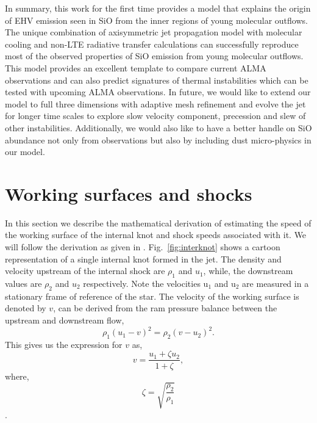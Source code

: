 \documentclass[useAMS,usenatbib]{mn2e}
\begin{document}
In summary, this work for the first time provides a model
that explains the origin of EHV emission seen in SiO from 
the inner regions of young molecular outflows. The unique combination
of axisymmetric jet propagation model with molecular cooling and
non-LTE radiative transfer calculations can successfully reproduce most
of the observed properties of SiO emission from young molecular
outflows. This model provides an excellent
template to compare current ALMA observations and can also predict
signatures of thermal instabilities which can be tested with upcoming
ALMA observations. In future, we would like to extend our
model to full three dimensions with adaptive mesh refinement
and evolve the jet for longer time scales to explore slow velocity 
component, precession and slew of other instabilities. Additionally, we would also like to have
a better handle on SiO abundance not only from observations but also
by including dust micro-physics in our model. 




\appendix
\section{Working surfaces and shocks}
In this section we describe the mathematical derivation of estimating
the speed of the working surface of the internal knot and shock speeds
associated with it. We will follow the derivation as given in
\citep{Raga:1990p16416,Raga:1992p16392}. Fig.~\ref{fig:interknot} shows a cartoon
representation of a single internal knot formed in the jet. 
The density and velocity upstream of the internal shock are
$\rho_{1}$ and $u_{1}$, while, the downstream values are $\rho_{2}$
and $u_{2}$ respectively. Note the velocities u$_1$ and u$_2$ are measured
in a stationary frame of reference of the star. The velocity of the working surface is
denoted by $v$, can be derived from the ram pressure balance between the upstream and
downstream flow,
\begin{equation}
\rho_1 (u_1 - v)^{2} = \rho_2 (v - u_2)^{2}.
\label{eq:ramPbal}
\end{equation}
This gives us the expression for $v$ as, 
\begin{equation}
v = \frac{u_1 + \zeta u_2}{1 + \zeta},
\label{eq:velws}
\end{equation} 
where, $$\zeta = \sqrt{\frac{\rho_{2}}{\rho_1}}$$.
\end{document}
